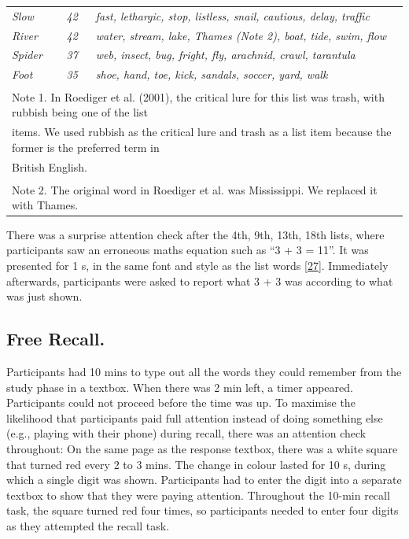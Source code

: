 \documentclass[
]{article}
\begin{document}
\begin{table}[H]
\begin{tabular}[t]{lll}
\em{Slow} & \em{42} & \em{fast, lethargic, stop, listless, snail, cautious, delay, traffic}\\
\em{River} & \em{42} & \em{water, stream, lake, Thames (Note 2), boat, tide, swim, flow}\\
\addlinespace
\em{Spider} & \em{37} & \em{web, insect, bug, fright, fly, arachnid, crawl, tarantula}\\
\em{Foot} & \em{35} & \em{shoe, hand, toe, kick, sandals, soccer, yard, walk}\\
\bottomrule
\multicolumn{3}{l}{\textsuperscript{} Note 1. In Roediger et al. (2001), the critical lure for this list was trash, with rubbish being one of the list}\\
\multicolumn{3}{l}{items. We used rubbish as the critical lure and trash as a list item because the former is the preferred term in}\\
\multicolumn{3}{l}{British English.}\\
\multicolumn{3}{l}{\textsuperscript{} Note 2. The original word in Roediger et al. was Mississippi. We replaced it with Thames.}\\
\end{tabular}
\end{table}

There was a surprise attention check after the 4th, 9th, 13th, 18th lists, where participants saw an erroneous maths equation such as ``3 + 3 = 11''. It was presented for 1 s, in the same font and style as the list words {[}\protect\hyperlink{ref-thomas2017a}{27}{]}. Immediately afterwards, participants were asked to report what 3 + 3 was according to what was just shown.

\hypertarget{free-recall.}{%
\subsection{Free Recall.}\label{free-recall.}}

Participants had 10 mins to type out all the words they could remember from the study phase in a textbox. When there was 2 min left, a timer appeared. Participants could not proceed before the time was up.
To maximise the likelihood that participants paid full attention instead of doing something else (e.g., playing with their phone) during recall, there was an attention check throughout: On the same page as the response textbox, there was a white square that turned red every 2 to 3 mins. The change in colour lasted for 10 s, during which a single digit was shown. Participants had to enter the digit into a separate textbox to show that they were paying attention. Throughout the 10-min recall task, the square turned red four times, so participants needed to enter four digits as they attempted the recall task.
\end{document}
